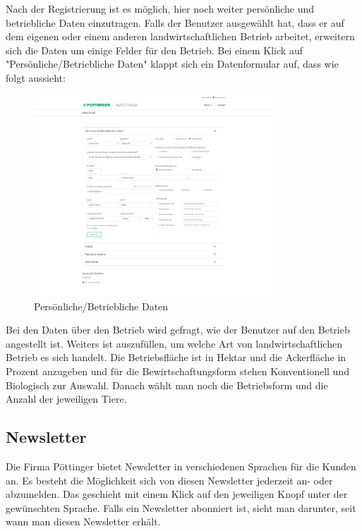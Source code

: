 Nach der Registrierung ist es möglich, hier noch weiter persönliche und betriebliche Daten einzutragen. Falls der Benutzer ausgewählt hat, dass er auf dem eigenen oder einem anderen landwirtschaftlichen Betrieb arbeitet, erweitern sich die Daten um einige Felder für den Betrieb. Bei einem Klick auf "Persönliche/Betriebliche Daten" klappt sich ein Datenformular auf, dass wie folgt aussieht:

\begin{figure}[H]
	\centerline{
		\includegraphics[width=0.8\textwidth]{./grafiken/erm_profil_daten.png}
	}
	\vskip0pt
	\caption{Persönliche/Betriebliche Daten} \label{fig:profilData}
\end{figure}

Bei den Daten über den Betrieb wird gefragt, wie der Benutzer auf den Betrieb angestellt ist. Weiters ist auszufüllen, um welche Art von landwirtschaftlichen Betrieb es sich handelt. Die Betriebsfläche ist in Hektar und die Ackerfläche in Prozent anzugeben und für die Bewirtschaftungsform stehen Konventionell und Biologisch zur Auswahl. Danach wählt man noch die Betriebsform und die Anzahl der jeweiligen Tiere.

\subsection{Newsletter}

Die Firma Pöttinger bietet Newsletter in verschiedenen Sprachen für die Kunden an. Es besteht die Möglichkeit sich von diesen Newsletter jederzeit an- oder abzumelden. Das geschieht mit einem Klick auf den jeweiligen Knopf unter der gewünschten Sprache. Falls ein Newsletter abonniert ist, sieht man darunter, seit wann man diesen Newsletter erhält.

